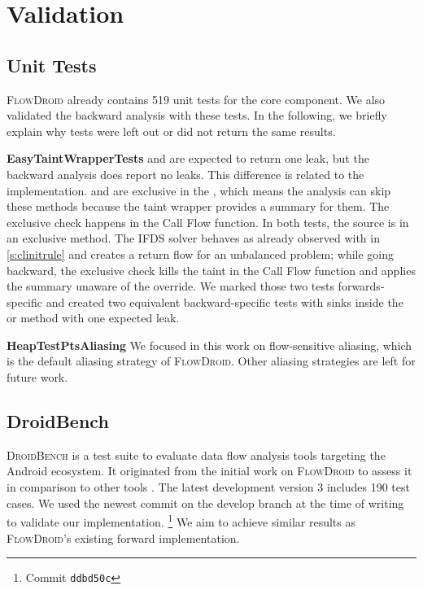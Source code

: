 \documentclass[../draft.tex]{subfiles}
\begin{document}
    \chapter{Validation}
    \section{Unit Tests}
    \textsc{FlowDroid} already contains 519 unit tests for the core component. 
    We also validated the backward analysis with these tests. 
    In the following, we briefly explain why tests were left out or did not return the same results.

    \textbf{EasyTaintWrapperTests} 
     and  are expected to return one leak, but the backward analysis does report no leaks. 
    This difference is related to the  implementation. 
     and  are exclusive in the , which means the analysis can skip these methods because the taint wrapper provides a summary for them. 
    The exclusive check happens in the Call Flow function. 
    In both tests, the source is in an exclusive method. 
    The IFDS solver behaves as already observed with  in \autoref{s:clinitrule} and creates a return flow for an unbalanced problem; while going backward, the exclusive check kills the taint in the Call Flow function and applies the summary unaware of the override.
    We marked those two tests forwards-specific and created two equivalent backward-specific tests with sinks inside the  or  method with one expected leak.

    \textbf{HeapTestPtsAliasing} 
    We focused in this work on flow-sensitive aliasing, which is the default aliasing strategy of \textsc{FlowDroid}. 
    Other aliasing strategies are left for future work.

    \section{DroidBench}\label{s:droidbenchvalidation}
    \textsc{DroidBench} is a test suite to evaluate data flow analysis tools targeting the Android ecosystem. 
    It originated from the initial work on \textsc{FlowDroid} to assess it in comparison to other tools \cite{Arzt2014}. 
    The latest development version 3 includes 190 test cases\footnotemark{}.
    We used the newest commit on the develop branch at the time of writing\footnotemark{} to validate our implementation.
    \footnote{Commit \texttt{ddbd50c}}
    We aim to achieve similar results as \textsc{FlowDroid}'s existing forward implementation.
    
\end{document}
